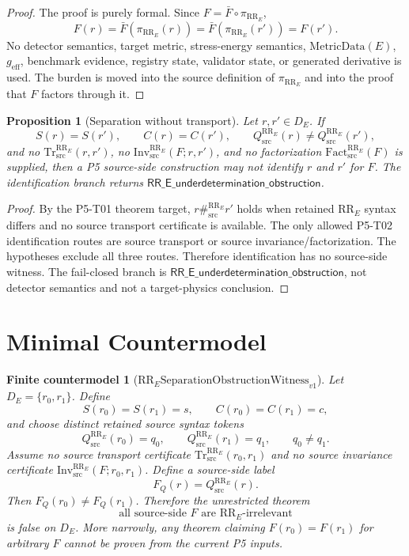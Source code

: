 \documentclass[11pt]{article}
\newcommand{\RRE}{\mathrm{RR}_E}
\newcommand{\Qsrc}{Q^{\RRE}_{\mathrm{src}}}
\newcommand{\SepRR}{\#^{\RRE}_{\mathrm{src}}}
\newcommand{\TrRR}{\mathrm{Tr}^{\RRE}_{\mathrm{src}}}
\newcommand{\InvRR}{\mathrm{Inv}^{\RRE}_{\mathrm{src}}}
\newcommand{\FactRR}{\mathrm{Fact}^{\RRE}_{\mathrm{src}}}
\newcommand{\MetricData}{\mathrm{MetricData}}
\newcommand{\geff}{g_{\mathrm{eff}}}
\newcommand{\RRUnder}{\mathsf{RR\_E\_underdetermination\_obstruction}}
\newcommand{\RRWitness}{\mathrm{RR}_{E}\mathrm{SeparationObstructionWitness}_{v1}}
\newtheorem{proposition}{Proposition}
\newtheorem{countermodel}{Finite countermodel}
\begin{document}
\begin{proof}
The proof is purely formal. Since \(F=\bar F\circ\pi_{\RRE}\),
\[
  F(r)=\bar F(\pi_{\RRE}(r))=\bar F(\pi_{\RRE}(r'))=F(r').
\]
No detector semantics, target metric, stress-energy semantics,
\(\MetricData(E)\), \(\geff\), benchmark evidence, registry state, validator
state, or generated derivative is used. The burden is moved into the source
definition of \(\pi_{\RRE}\) and into the proof that \(F\) factors through it.
\end{proof}

\begin{proposition}[Separation without transport]
Let \(r,r'\in D_E\). If
\[
  S(r)=S(r'),\qquad C(r)=C(r'),\qquad \Qsrc(r)\ne \Qsrc(r'),
\]
and no \(\TrRR(r,r')\), no \(\InvRR(F;r,r')\), and no factorization
\(\FactRR(F)\) is supplied, then a P5 source-side construction may not identify
\(r\) and \(r'\) for \(F\). The identification branch returns \(\RRUnder\).
\end{proposition}

\begin{proof}
By the P5-T01 theorem target, \(r\SepRR r'\) holds when retained
\(\RRE\) syntax differs and no source transport certificate is available. The
only allowed P5-T02 identification routes are source transport or source
invariance/factorization. The hypotheses exclude all three routes. Therefore
identification has no source-side witness. The fail-closed branch is
\(\RRUnder\), not detector semantics and not a target-physics conclusion.
\end{proof}

\section{Minimal Countermodel}

\begin{countermodel}[\(\RRWitness\)]
Let \(D_E=\{r_0,r_1\}\). Define
\[
  S(r_0)=S(r_1)=s,\qquad C(r_0)=C(r_1)=c,
\]
and choose distinct retained source syntax tokens
\[
  \Qsrc(r_0)=q_0,\qquad \Qsrc(r_1)=q_1,\qquad q_0\ne q_1.
\]
Assume no source transport certificate \(\TrRR(r_0,r_1)\) and no source
invariance certificate \(\InvRR(F;r_0,r_1)\). Define a source-side label
\[
  F_Q(r)=\Qsrc(r).
\]
Then \(F_Q(r_0)\ne F_Q(r_1)\). Therefore the unrestricted theorem
\[
  \text{all source-side \(F\) are \(\RRE\)-irrelevant}
\]
is false on \(D_E\). More narrowly, any theorem claiming \(F(r_0)=F(r_1)\)
for arbitrary \(F\) cannot be proven from the current P5 inputs.
\end{countermodel}
\end{document}

